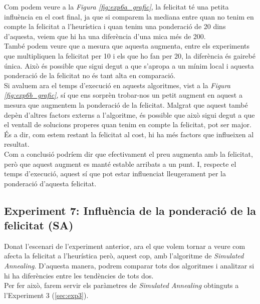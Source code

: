 \documentclass[a4paper]{article}
\begin{document}
	Com podem veure a la \textit{Figura \ref{fig:exp6a_grafic}}, la felicitat té una petita influència en el cost final, ja que si comparem la mediana entre quan no tenim en compte la felicitat a l'heurística i quan tenim una ponderació de 20 dins d'aquesta, veiem que hi ha una diferència d'una mica més de 200. \\
	
	També podem veure que a mesura que aquesta augmenta, entre els experiments que multipliquen la felicitat per 10 i els que ho fan per 20, la diferència és gairebé única. Això és possible que sigui degut a que s'apropa a un mínim local i aquesta ponderació de la felicitat no és tant alta en comparació. \\
	
	Si avaluem ara el temps d'execució en aquests algoritmes, vist a la \textit{Figura \ref{fig:exp6b_grafic}}, sí que ens sorprèn trobar-nos un petit augment en aquest a mesura que augmentem la ponderació de la felicitat. Malgrat que aquest també depèn d'altres factors externs a l'algoritme, és possible que això sigui degut a que el ventall de solucions properes quan tenim en compte la felicitat, pot ser major. És a dir, com estem restant la felicitat al cost, hi ha més factors que influeixen al resultat. \\
	
	Com a conclusió podríem dir que efectivament el preu augmenta amb la felicitat, però que aquest augment es manté estable arribats a un punt. I, respecte el temps d'execució, aquest sí que pot estar influenciat lleugerament per la ponderació d'aquesta felicitat.
	
	\subsection{Experiment 7: Influència de la ponderació de la felicitat (SA)}
	
	Donat l'escenari de l'experiment anterior, ara el que volem tornar a veure com afecta la felicitat a l'heurística però, aquest cop, amb l'algoritme de \textit{Simulated Annealing}. D'aquesta manera, podrem comparar tots dos algoritmes i analitzar si hi ha diferències entre les tendències de tots dos. \\
	
	Per fer això, farem servir els paràmetres de \textit{Simulated Annealing} obtinguts a l'Experiment 3 (\ref{sec:exp3}).
	
\end{document}
